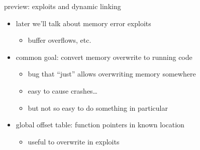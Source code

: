 \begin{frame}{preview: exploits and dynamic linking}
    \begin{itemize}
    \item later we'll talk about memory error exploits
        \begin{itemize}
        \item buffer overflows, etc.
        \end{itemize}
    \item common goal: convert memory overwrite to running code
        \begin{itemize}
        \item bug that ``just'' allows overwriting memory somewhere
        \item easy to cause crashes\ldots
        \item but not so easy to do something in particular
        \end{itemize}
    \item global offset table: function pointers in known location
        \begin{itemize}
        \item useful to overwrite in exploits
        \end{itemize}
    \end{itemize}
\end{frame}
